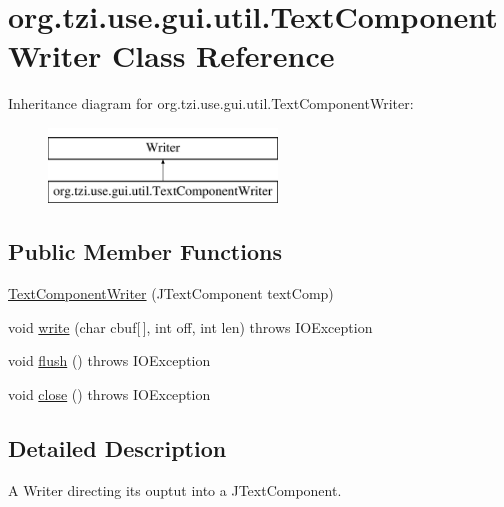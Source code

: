 \hypertarget{classorg_1_1tzi_1_1use_1_1gui_1_1util_1_1_text_component_writer}{\section{org.\-tzi.\-use.\-gui.\-util.\-Text\-Component\-Writer Class Reference}
\label{classorg_1_1tzi_1_1use_1_1gui_1_1util_1_1_text_component_writer}
}
Inheritance diagram for org.\-tzi.\-use.\-gui.\-util.\-Text\-Component\-Writer\-:\begin{figure}[H]
\begin{center}
\leavevmode
\includegraphics[height=2.000000cm]{classorg_1_1tzi_1_1use_1_1gui_1_1util_1_1_text_component_writer}
\end{center}
\end{figure}
\subsection*{Public Member Functions}
\begin{DoxyCompactItemize}
\item 
\hyperlink{classorg_1_1tzi_1_1use_1_1gui_1_1util_1_1_text_component_writer_af24967d24d137b06f6f3563365bde172}{Text\-Component\-Writer} (J\-Text\-Component text\-Comp)
\item 
void \hyperlink{classorg_1_1tzi_1_1use_1_1gui_1_1util_1_1_text_component_writer_a980a0ceea68fa47ce79dae479abcad60}{write} (char cbuf\mbox{[}$\,$\mbox{]}, int off, int len)  throws I\-O\-Exception 
\item 
void \hyperlink{classorg_1_1tzi_1_1use_1_1gui_1_1util_1_1_text_component_writer_aa1fdb52238e6238fd64641565952d74f}{flush} ()  throws I\-O\-Exception 
\item 
void \hyperlink{classorg_1_1tzi_1_1use_1_1gui_1_1util_1_1_text_component_writer_aa98f3c96c9777d2866891eed99705ed0}{close} ()  throws I\-O\-Exception 
\end{DoxyCompactItemize}


\subsection{Detailed Description}
A Writer directing its ouptut into a J\-Text\-Component.

